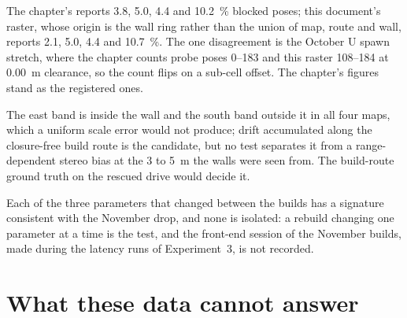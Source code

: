 \documentclass[11pt,a4paper,notitlepage]{report}
\begin{document}
\begin{queried}
The chapter's  reports 3.8, 5.0, 4.4 and
\SI{10.2}{\percent} blocked poses; this document's raster, whose origin is the
wall ring rather than the union of map, route and wall, reports 2.1, 5.0, 4.4
and \SI{10.7}{\percent}. The one disagreement is the October U spawn stretch,
where the chapter counts probe poses 0--183 and this raster 108--184 at
\SI{0.00}{\metre} clearance, so the count flips on a sub-cell offset. The
chapter's figures stand as the registered ones.
\end{queried}

\begin{queried}
The east band is inside the wall and the south band outside it in all four
maps, which a uniform scale error would not produce; drift accumulated along
the closure-free build route is the candidate, but no test separates it from a
range-dependent stereo bias at the 3 to \SI{5}{\metre} the walls were seen
from. The build-route ground truth on the rescued drive would decide it.
\end{queried}

\begin{queried}
Each of the three parameters that changed between the builds has a signature
consistent with the November drop, and none is isolated: a rebuild changing
one parameter at a time is the test, and the front-end session of the November
builds, made during the latency runs of Experiment~3, is not recorded.
\end{queried}

\FloatBarrier
\section{What these data cannot answer}
\end{document}
